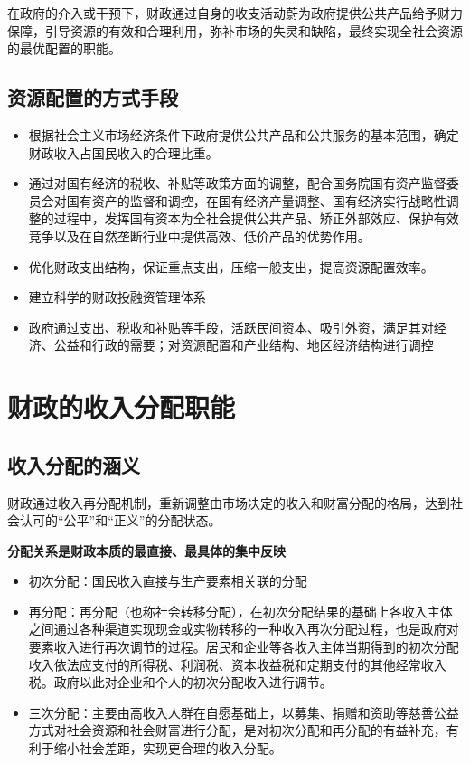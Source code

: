 \documentclass[
]{book}
\providecommand{\tightlist}{%
  \setlength{\itemsep}{0pt}\setlength{\parskip}{0pt}}
\theoremstyle{definition}
\theoremstyle{definition}
\theoremstyle{definition}
\theoremstyle{definition}
\theoremstyle{remark}
\begin{document}
在政府的介入或干预下，财政通过自身的收支活动蔚为政府提供公共产品给予财力保障，引导资源的有效和合理利用，弥补市场的失灵和缺陷，最终实现全社会资源的最优配置的职能。

\hypertarget{ux8d44ux6e90ux914dux7f6eux7684ux65b9ux5f0fux624bux6bb5}{%
\subsection{资源配置的方式手段}\label{ux8d44ux6e90ux914dux7f6eux7684ux65b9ux5f0fux624bux6bb5}}

\begin{itemize}
\tightlist
\item
  根据社会主义市场经济条件下政府提供公共产品和公共服务的基本范围，确定财政收入占国民收入的合理比重。
\item
  通过对国有经济的税收、补贴等政策方面的调整，配合国务院国有资产监督委员会对国有资产的监督和调控，在国有经济产量调整、国有经济实行战略性调整的过程中，发挥国有资本为全社会提供公共产品、矫正外部效应、保护有效竞争以及在自然垄断行业中提供高效、低价产品的优势作用。
\item
  优化财政支出结构，保证重点支出，压缩一般支出，提高资源配置效率。
\item
  建立科学的财政投融资管理体系
\item
  政府通过支出、税收和补贴等手段，活跃民间资本、吸引外资，满足其对经济、公益和行政的需要；对资源配置和产业结构、地区经济结构进行调控
\end{itemize}

\hypertarget{ux8d22ux653fux7684ux6536ux5165ux5206ux914dux804cux80fd}{%
\section{财政的收入分配职能}\label{ux8d22ux653fux7684ux6536ux5165ux5206ux914dux804cux80fd}}

\hypertarget{ux6536ux5165ux5206ux914dux7684ux6db5ux4e49}{%
\subsection{收入分配的涵义}\label{ux6536ux5165ux5206ux914dux7684ux6db5ux4e49}}

财政通过收入再分配机制，重新调整由市场决定的收入和财富分配的格局，达到社会认可的``公平''和``正义''的分配状态。

\textbf{分配关系是财政本质的最直接、最具体的集中反映}

\begin{itemize}
\tightlist
\item
  初次分配：国民收入直接与生产要素相关联的分配
\item
  再分配：再分配（也称社会转移分配），在初次分配结果的基础上各收入主体之间通过各种渠道实现现金或实物转移的一种收入再次分配过程，也是政府对要素收入进行再次调节的过程。居民和企业等各收入主体当期得到的初次分配收入依法应支付的所得税、利润税、资本收益税和定期支付的其他经常收入税。政府以此对企业和个人的初次分配收入进行调节。
\item
  三次分配：主要由高收入人群在自愿基础上，以募集、捐赠和资助等慈善公益方式对社会资源和社会财富进行分配，是对初次分配和再分配的有益补充，有利于缩小社会差距，实现更合理的收入分配。
\end{itemize}
\end{document}

